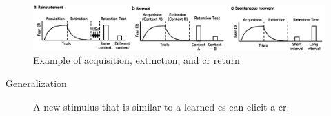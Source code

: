\begin{figure}[H]
    \centering
    \includegraphics[width=0.95\linewidth]{./img/pavlovian_extinction.png}
    \caption{Example of acquisition, extinction, and \ac{cr} return}
\end{figure}

\begin{description}
    \item[Generalization]  
        A new stimulus that is similar to a learned \acl{cs} can elicit a \acl{cr}.
\end{description}

